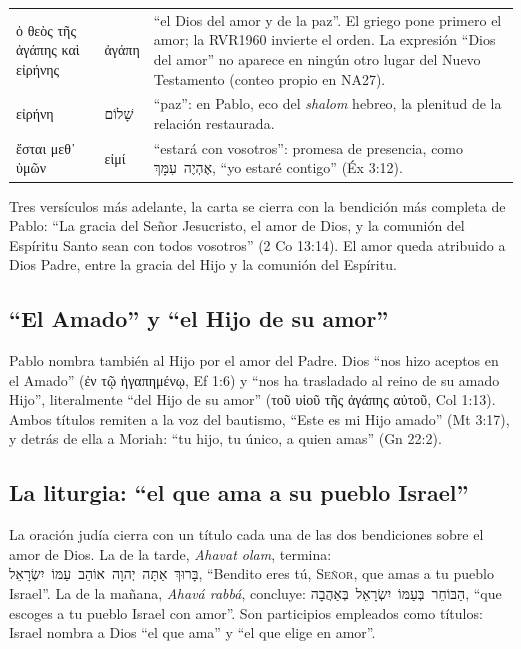 \documentclass[11pt,letterpaper]{article}
\newcommand{\heb}[1]{\mbox{\foreignlanguage{hebrew}{#1}}}
\newcommand{\grc}[1]{\foreignlanguage{ancientgreek}{#1}}
\newcommand{\SENOR}{\textsc{Señor}}
\begin{document}
\begin{filologia}[2 Co 13:11]
\begin{tabular}{@{}L{3.6cm}L{1.6cm}L{9.6cm}@{}}
\grc{ὁ θεὸς τῆς ἀγάπης καὶ εἰρήνης} & \grc{ἀγάπη} & ``el Dios del amor y de la paz''. El griego pone primero el amor; la RVR1960 invierte el orden. La expresión ``Dios del amor'' no aparece en ningún otro lugar del Nuevo Testamento (conteo propio en NA27). \\[2pt]
\grc{εἰρήνη} & \heb{שָׁלוֹם} & ``paz'': en Pablo, eco del \emph{shalom} hebreo, la plenitud de la relación restaurada. \\[2pt]
\grc{ἔσται μεθ᾽ ὑμῶν} & \grc{εἰμί} & ``estará con vosotros'': promesa de presencia, como \heb{אֶהְיֶה עִמָּךְ}, ``yo estaré contigo'' (Éx 3:12). \\
\end{tabular}
\end{filologia}

Tres versículos más adelante, la carta se cierra con la bendición más completa de Pablo: ``La gracia del Señor Jesucristo, el amor de Dios, y la comunión del Espíritu Santo sean con todos vosotros'' (2 Co 13:14). El amor queda atribuido a Dios Padre, entre la gracia del Hijo y la comunión del Espíritu.

\subsection{``El Amado'' y ``el Hijo de su amor''}
Pablo nombra también al Hijo por el amor del Padre. Dios ``nos hizo aceptos en el Amado'' (\grc{ἐν τῷ ἠγαπημένῳ}, Ef 1:6) y ``nos ha trasladado al reino de su amado Hijo'', literalmente ``del Hijo de su amor'' (\grc{τοῦ υἱοῦ τῆς ἀγάπης αὐτοῦ}, Col 1:13). Ambos títulos remiten a la voz del bautismo, ``Este es mi Hijo amado'' (Mt 3:17), y detrás de ella a Moriah: ``tu hijo, tu único, a quien amas'' (Gn 22:2).

\subsection{La liturgia: ``el que ama a su pueblo Israel''}
La oración judía cierra con un título cada una de las dos bendiciones sobre el amor de Dios. La de la tarde, \emph{Ahavat olam}, termina: \heb{בָּרוּךְ אַתָּה יְהוָה אוֹהֵב עַמּוֹ יִשְׂרָאֵל}, ``Bendito eres tú, \SENOR, que amas a tu pueblo Israel''. La de la mañana, \emph{Ahavá rabbá}, concluye: \heb{הַבּוֹחֵר בְּעַמּוֹ יִשְׂרָאֵל בְּאַהֲבָה}, ``que escoges a tu pueblo Israel con amor''. Son participios empleados como títulos: Israel nombra a Dios ``el que ama'' y ``el que elige en amor''.
\end{document}
